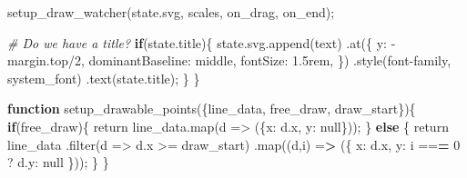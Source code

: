 \documentclass[print]{nuthesis}
\newenvironment{Shaded}{\begin{snugshade}}{\end{snugshade}}
\newcommand{\AttributeTok}[1]{\textcolor[rgb]{0.77,0.63,0.00}{#1}}
\newcommand{\CommentTok}[1]{\textcolor[rgb]{0.56,0.35,0.01}{\textit{#1}}}
\newcommand{\ControlFlowTok}[1]{\textcolor[rgb]{0.13,0.29,0.53}{\textbf{#1}}}
\newcommand{\DecValTok}[1]{\textcolor[rgb]{0.00,0.00,0.81}{#1}}
\newcommand{\ErrorTok}[1]{\textcolor[rgb]{0.64,0.00,0.00}{\textbf{#1}}}
\newcommand{\FunctionTok}[1]{\textcolor[rgb]{0.00,0.00,0.00}{#1}}
\newcommand{\NormalTok}[1]{#1}
\newcommand{\OtherTok}[1]{\textcolor[rgb]{0.56,0.35,0.01}{#1}}
\newcommand{\SpecialCharTok}[1]{\textcolor[rgb]{0.00,0.00,0.00}{#1}}
\newcommand{\StringTok}[1]{\textcolor[rgb]{0.31,0.60,0.02}{#1}}
\begin{document}
\begin{Shaded}
\begin{Highlighting}[]
  \FunctionTok{setup\_draw\_watcher}\NormalTok{(state.svg, scales, on\_drag, on\_end);}
  
  \CommentTok{\# Do we have a title?}
    \ControlFlowTok{if}\NormalTok{(state.title)\{}
      \FunctionTok{state.svg.append}\NormalTok{(}\StringTok{\textquotesingle{}text\textquotesingle{}}\NormalTok{)}
      \FunctionTok{.at}\NormalTok{(\{}
\NormalTok{        y}\SpecialCharTok{:} \SpecialCharTok{{-}}\NormalTok{margin.top}\SpecialCharTok{/}\DecValTok{2}\NormalTok{,}
\NormalTok{        dominantBaseline}\SpecialCharTok{:} \StringTok{\textquotesingle{}middle\textquotesingle{}}\NormalTok{,}
\NormalTok{        fontSize}\SpecialCharTok{:} \StringTok{\textquotesingle{}1.5rem\textquotesingle{}}\NormalTok{,}
\NormalTok{      \})}
      \FunctionTok{.style}\NormalTok{(}\StringTok{\textquotesingle{}font{-}family\textquotesingle{}}\NormalTok{, system\_font)}
      \FunctionTok{.text}\NormalTok{(state.title);}
\NormalTok{    \}}
\NormalTok{\}}

\ControlFlowTok{function} \FunctionTok{setup\_drawable\_points}\NormalTok{(\{line\_data, free\_draw, draw\_start\})\{}
  \ControlFlowTok{if}\NormalTok{(free\_draw)\{}
\NormalTok{    return }\FunctionTok{line\_data.map}\NormalTok{(}\AttributeTok{d =}\SpecialCharTok{\textgreater{}}\NormalTok{ (\{x}\SpecialCharTok{:}\NormalTok{ d.x, y}\SpecialCharTok{:}\NormalTok{ null\}));}
\NormalTok{  \} }\ControlFlowTok{else}\NormalTok{ \{}
\NormalTok{    return line\_data}
    \FunctionTok{.filter}\NormalTok{(}\AttributeTok{d =}\SpecialCharTok{\textgreater{}}\NormalTok{ d.x }\SpecialCharTok{\textgreater{}=}\NormalTok{ draw\_start)}
    \FunctionTok{.map}\NormalTok{((d,i) }\OtherTok{=}\ErrorTok{\textgreater{}}\NormalTok{ (\{}
\NormalTok{      x}\SpecialCharTok{:}\NormalTok{ d.x,}
\NormalTok{      y}\SpecialCharTok{:}\NormalTok{ i }\SpecialCharTok{==}\ErrorTok{=} \DecValTok{0}\NormalTok{ ? d.y}\SpecialCharTok{:}\NormalTok{ null}
\NormalTok{    \}));}
\NormalTok{  \}}
\NormalTok{\}}


\end{Highlighting}
\end{Shaded}
\end{document}
